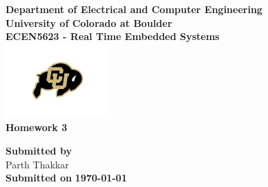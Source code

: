 \begin{titlepage}
\center %

\textbf{\large Department of Electrical and Computer Engineering}\\[0.5cm]
\textbf{\Large University of Colorado at Boulder}\\[1cm]
\textbf{\large ECEN5623 - Real Time Embedded Systems }\\[2cm]
\includegraphics[width=0.3\textwidth]{figures/cu}\\[2cm]

	
\textbf{\Huge Homework 3 }\\[0.2cm]





\vfill

\textbf{\large Submitted by}\\[0.5cm]

{\large Parth Thakkar}\\[0.5cm]	


\textbf{\large Submitted on}
\textbf{\Large \today} %


\vfill %

\end{titlepage}